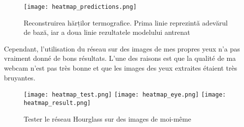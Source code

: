 \begin{figure}[h]
    \centering
    \texttt{[image: heatmap\_predictions.png]}
    \caption{Reconstruirea hărților termografice. Prima linie reprezintă adevărul de bază, iar a doua linie rezultatele modelului antrenat}
\end{figure}


Cependant, l'utilisation du réseau sur des images de mes propres yeux n'a pas vraiment donné de bons résultats.
L'une des raisons est que la qualité de ma webcam n'est pas très bonne et que les images des yeux extraites étaient très bruyantes.

\begin{figure}[h]
    \centering
    \texttt{[image: heatmap\_test.png]}
    \texttt{[image: heatmap\_eye.png]}
    \texttt{[image: heatmap\_result.png]}
    \caption{Tester le réseau Hourglass sur des images de moi-même}
\end{figure}
